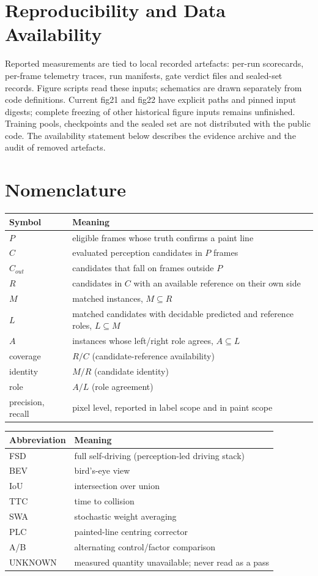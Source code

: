 \documentclass[journal]{IEEEtran}
\begin{document}
\section*{Reproducibility and Data Availability}
Reported measurements are tied to local recorded artefacts: per-run scorecards, per-frame telemetry
traces, run manifests, gate verdict files and sealed-set records. Figure scripts read these inputs;
schematics are drawn separately from code definitions. Current fig21 and fig22 have explicit paths
and pinned input digests; complete freezing of other historical figure inputs remains unfinished.
Training pools, checkpoints and the sealed set are not distributed with the public code. The
availability statement below describes the evidence archive and the audit of removed artefacts.
\section*{Nomenclature}
\begin{table}[!t]
\centering
\begin{tabular}{@{}ll@{}}
\toprule
Symbol & Meaning \\
\midrule
$P$ & eligible frames whose truth confirms a paint line \\
$C$ & evaluated perception candidates in $P$ frames \\
$C_{out}$ & candidates that fall on frames outside $P$ \\
$R$ & candidates in $C$ with an available reference on their own side \\
$M$ & matched instances, $M \subseteq R$ \\
$L$ & matched candidates with decidable predicted and reference roles, $L \subseteq M$ \\
$A$ & instances whose left/right role agrees, $A \subseteq L$ \\
coverage & $R/C$ (candidate-reference availability) \\
identity & $M/R$ (candidate identity) \\
role & $A/L$ (role agreement) \\
precision, recall & pixel level, reported in label scope and in paint scope \\
\bottomrule
\end{tabular}
\end{table}
\begin{table}[!t]
\centering
\begin{tabular}{@{}ll@{}}
\toprule
Abbreviation & Meaning \\
\midrule
FSD & full self-driving (perception-led driving stack) \\
BEV & bird's-eye view \\
IoU & intersection over union \\
TTC & time to collision \\
SWA & stochastic weight averaging \\
PLC & painted-line centring corrector \\
A/B & alternating control/factor comparison \\
UNKNOWN & measured quantity unavailable; never read as a pass \\
\bottomrule
\end{tabular}
\end{table}
\end{document}

